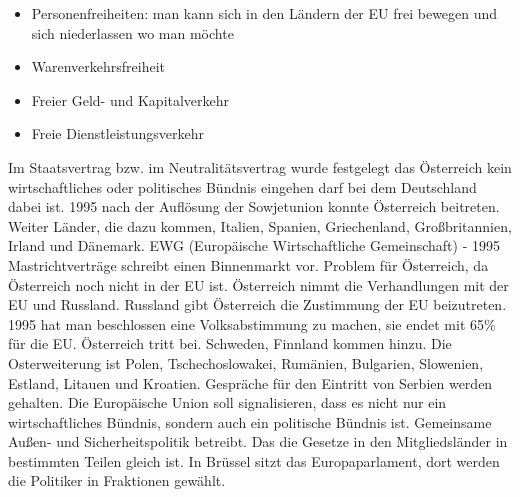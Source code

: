 \documentclass[a4paper,final]{report}
\begin{document}
\begin{itemize}
\item Personenfreiheiten: man kann sich in den Ländern der EU frei bewegen und sich niederlassen wo man möchte
\item Warenverkehrsfreiheit
\item Freier Geld- und Kapitalverkehr
\item Freie Dienstleistungsverkehr
\end{itemize}

Im Staatsvertrag bzw. im Neutralitätsvertrag wurde festgelegt das Österreich kein wirtschaftliches oder politisches Bündnis  eingehen darf bei dem Deutschland dabei ist. 1995 nach der Auflösung der Sowjetunion konnte Österreich beitreten. Weiter Länder, die dazu kommen, Italien, Spanien, Griechenland, Großbritannien, Irland und Dänemark.
\newline
\newline
EWG (Europäische Wirtschaftliche Gemeinschaft) - 1995 Mastrichtverträge schreibt einen Binnenmarkt vor. Problem für Österreich, da Österreich noch nicht in der EU ist. Österreich nimmt die Verhandlungen  mit der EU und Russland. Russland gibt Österreich die Zustimmung der EU beizutreten. 1995 hat man beschlossen eine Volksabstimmung zu machen, sie endet mit 65\% für die EU. Österreich tritt bei.
\newline
\newline
Schweden, Finnland kommen hinzu. Die Osterweiterung ist Polen, Tschechoslowakei, Rumänien, Bulgarien, Slowenien, Estland, Litauen und Kroatien. Gespräche für den Eintritt von Serbien werden gehalten. 
\newline
\newline
Die Europäische Union soll signalisieren, dass es nicht nur ein wirtschaftliches Bündnis, sondern auch ein politische Bündnis ist. Gemeinsame Außen- und Sicherheitspolitik betreibt. Das die Gesetze in den Mitgliedsländer in bestimmten Teilen gleich ist.
\newline
\newline
In Brüssel sitzt das Europaparlament, dort werden die Politiker in Fraktionen gewählt.
\end{document}
